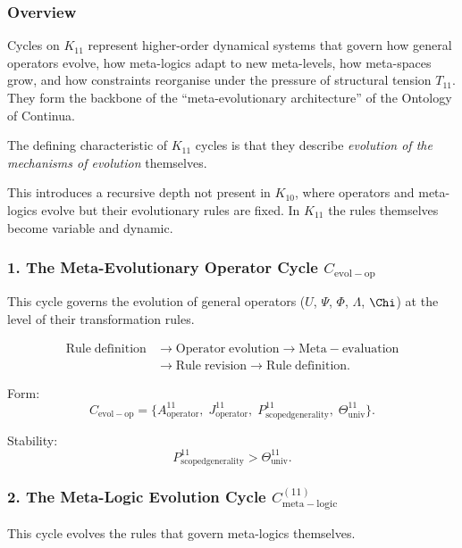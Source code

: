 \subsubsection{Overview}

Cycles on $K_{11}$ represent higher-order dynamical systems that govern
how general operators evolve, how meta-logics adapt to new meta-levels,
how meta-spaces grow, and how constraints reorganise under the pressure of
structural tension $T_{11}$. They form the backbone of the ``meta-evolutionary
architecture'' of the Ontology of Continua.

The defining characteristic of $K_{11}$ cycles is that they describe
\emph{evolution of the mechanisms of evolution} themselves.

This introduces a recursive depth not present in $K_{10}$, where operators
and meta-logics evolve but their evolutionary rules are fixed.
In $K_{11}$ the rules themselves become variable and dynamic.


\subsubsection{1. The Meta-Evolutionary Operator Cycle $C_{\mathrm{evol-op}}$}

This cycle governs the evolution of general operators ($U$, $\Psi$, $\Phi$,
$\Lambda$, $\Chi$) at the level of their transformation rules.

\[
  \begin{aligned}
  \mathrm{Rule\;definition}
  &\to \mathrm{Operator\;evolution}
  \to \mathrm{Meta\!-\!evaluation}\\
  &\to \mathrm{Rule\;revision}
  \to \mathrm{Rule\;definition}.
  \end{aligned}
\]

Form:
\[
  C_{\mathrm{evol-op}}
  =
  \{
    A^{11}_{\mathrm{operator}},\;
    J^{11}_{\mathrm{operator}},\;
    P^{11}_{\mathrm{scoped generality}},\;
    \Theta^{11}_{\mathrm{univ}}
  \}.
\]

Stability:
\[
  P^{11}_{\mathrm{scoped generality}}>\Theta^{11}_{\mathrm{univ}}.
\]


\subsubsection{2. The Meta-Logic Evolution Cycle $C_{\mathrm{meta\!-\!logic}}^{(11)}$}

This cycle evolves the rules that govern meta-logics themselves.

